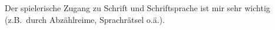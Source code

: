 Der spielerische Zugang zu Schrift und Schriftsprache ist mir sehr wichtig (z.B.\ durch Abzählreime, Sprachrätsel o.ä.).